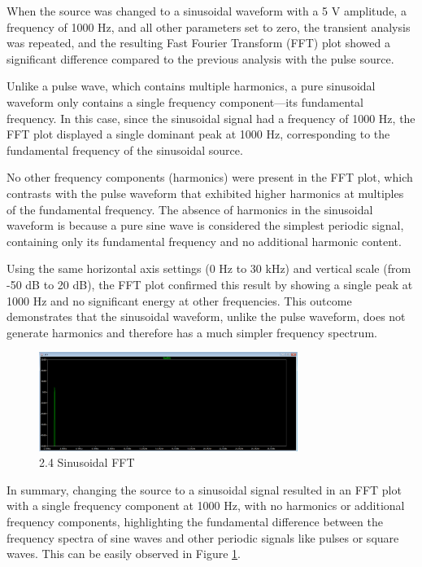 \documentclass{article}
\begin{document}
When the source was changed to a sinusoidal waveform with a 5 V amplitude, a frequency of 1000 Hz, and all other parameters 
set to zero, the transient analysis was repeated, and the resulting Fast Fourier Transform (FFT) plot showed a significant 
difference compared to the previous analysis with the pulse source.
\newline

Unlike a pulse wave, which contains multiple harmonics, a pure sinusoidal waveform only contains a single frequency 
component—its fundamental frequency. In this case, since the sinusoidal signal had a frequency of 1000 Hz, the FFT 
plot displayed a single dominant peak at 1000 Hz, corresponding to the fundamental frequency of the sinusoidal source.
\newline

No other frequency components (harmonics) were present in the FFT plot, which contrasts with the pulse waveform that 
exhibited higher harmonics at multiples of the fundamental frequency. The absence of harmonics in the sinusoidal 
waveform is because a pure sine wave is considered the simplest periodic signal, containing only its fundamental 
frequency and no additional harmonic content.
\newline

Using the same horizontal axis settings (0 Hz to 30 kHz) and vertical scale (from -50 dB to 20 dB), the FFT plot 
confirmed this result by showing a single peak at 1000 Hz and no significant energy at other frequencies. This outcome 
demonstrates that the sinusoidal waveform, unlike the pulse waveform, does not generate harmonics and therefore has a 
much simpler frequency spectrum.
\newline

\begin{figure}[H]
	\centering
	\includegraphics[width=0.75\textwidth]{Copy of Lab 4 - 2.4.PNG}
	\caption{2.4 Sinusoidal FFT}
	\label{fig:fig5}
\end{figure}

In summary, changing the source to a sinusoidal signal resulted in an FFT plot with a single frequency component at 
1000 Hz, with no harmonics or additional frequency components, highlighting the fundamental difference between the 
frequency spectra of sine waves and other periodic signals like pulses or square waves. This can be easily observed in 
Figure \ref{fig:fig5}.
\newline
\end{document}
